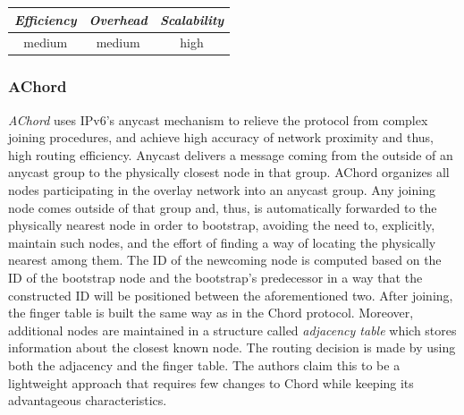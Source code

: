 

\begin{center}
\begin{tabular}{ccc}
\emph{Efficiency} & \emph{Overhead} & \emph{Scalability} \\
\hline
medium &
medium &
high
\end{tabular}
\end{center}

\subsubsection{AChord}
\emph{AChord} \cite{DK2006} uses IPv6's anycast mechanism to
relieve the protocol from complex joining procedures, and achieve high accuracy
of network proximity and thus, high routing efficiency. Anycast delivers a message
coming from the outside of an anycast group to the physically closest node in
that group. AChord organizes all nodes participating in the overlay network into
an anycast group. Any joining node comes outside of that group and, thus, is
automatically forwarded to the physically nearest node in order to bootstrap,
avoiding the need to, explicitly, maintain such nodes, and the effort of finding
a way of locating the physically nearest among them. The ID of the newcoming
node is computed based on the ID of the bootstrap node and the bootstrap's
predecessor in a way that the constructed ID will be positioned between the
aforementioned two. After joining, the finger table is built the same way as in
the Chord protocol. Moreover, additional nodes are maintained in a structure
called \emph{adjacency table} which stores information about the closest known
node. The routing decision is made by using both the adjacency and the finger
table. The authors claim this to be a lightweight approach that requires few
changes to Chord while keeping its advantageous characteristics.

